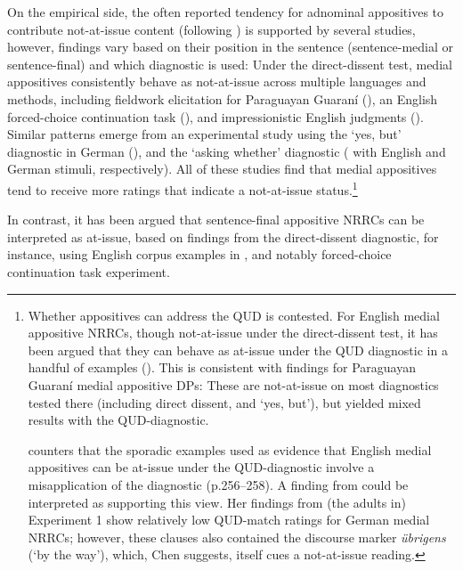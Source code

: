 \documentclass[times,linguex,xcolor]{glossa}
\begin{document}
  On the empirical side, the often reported tendency for adnominal appositives to contribute not-at-issue content (following \citealt{potts_logic_2005}) is supported by several studies, however, findings vary based on their position in the sentence (sentence-medial or sentence-final) and which diagnostic is used:
  Under the direct-dissent test, medial appositives consistently behave as not-at-issue across multiple languages and methods, including fieldwork elicitation for Paraguayan Guaraní (\citealt{tonhauser_diagnosing_2012}), an English forced-choice continuation task (\citealt{syrett_experimental_2015}), and impressionistic English judgments (\citealt{potts_logic_2005,amaral_review_2007}). Similar patterns emerge from an experimental study using the `yes, but' diagnostic in German (\citealt{destruel_cross-linguistic_2015}), and the `asking whether' diagnostic (\citealt{tonhauser_how_2018,solstad_cataphoric_2024} with English and German stimuli, respectively). All of these studies find that medial appositives tend to receive more ratings that indicate a not-at-issue status.\footnote{
      Whether appositives can address the QUD is contested. 
      For English medial appositive NRRCs, though not-at-issue under the direct-dissent test, it has been argued that they can behave as at-issue under the QUD diagnostic in a handful of examples (\citealt{anderbois_at-issue_2015,syrett_experimental_2015}).
      This is consistent with  findings for Paraguayan Guaraní medial appositive DPs: These are not-at-issue on most diagnostics tested there (including direct dissent, and `yes, but'), but yielded mixed results with the QUD-diagnostic.

      \citealt{snider_anaphoric_2017} counters that the sporadic examples used as evidence that English medial appositives can be at-issue under the QUD-diagnostic involve a misapplication of the diagnostic (p.256--258).
      A finding from \citealt{chen_presuppositions_2024} could be interpreted as supporting this view. Her findings from (the adults in) Experiment 1 show relatively low QUD-match ratings for German medial NRRCs; however, these clauses also contained the discourse marker \emph{übrigens} (‘by the way’), which, Chen suggests, itself cues a not-at-issue reading.
      
    }

  In contrast, it has been argued that sentence-final appositive NRRCs can be interpreted as at-issue, based on findings from the direct-dissent diagnostic, for instance, using English corpus examples in \citealt{anderbois_at-issue_2015}, and notably  forced-choice continuation task experiment.
\end{document}
